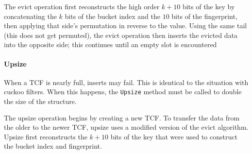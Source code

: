 \documentclass[letterpaper,twocolumn,10pt]{article}
\newcommand{\ints}{\mathbb{Z}}
\newcommand{\dotcup}{\ensuremath{\mathaccent\cdot\cup}}
\begin{document}
The evict operation first reconstructs the high order $k + 10$ bits of the key by concatenating the $k$ bits of the bucket index and the $10$ bits of the fingerprint, then applying that side's permutation in reverse to the value. %
Using the same tail (this does not get permuted), the evict operation then inserts the evicted data into the opposite side;
this continues until an empty slot is encountered %





\paragraph{Upsize}
When a TCF is nearly full, inserts may fail.
This is identical to the situation with cuckoo filters.
When this happens, the \texttt{Upsize} method must be called to double the size of the structure. %

The upsize operation begins by creating a new TCF. %
To transfer the data from the older to the newer TCF, upsize uses a modified version of the evict algorithm.
Upsize first reconstructs the $k+10$ bits of the key that were used to construct the bucket index and fingerprint. %
\end{document}
